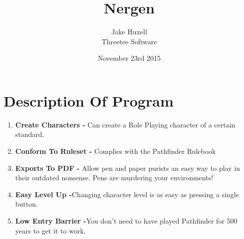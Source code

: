 \documentclass[12pt, a4paper]{article}
\title{Nergen}
\author{Jake Huxell\\Threetee Software}
\date{November 23rd 2015}
\begin{document}
\maketitle 
\tableofcontents
\section{Description Of Program}
\begin{enumerate}
\item{\textbf{Create Characters - }Can create a Role Playing character of a certain standard.}
\item{\textbf{Conform To Ruleset - }Complies with the Pathfinder Rulebook}
\item{\textbf{Exports To PDF - }Allow pen and paper purists an easy way to play in their outdated nonsense. Pens are murdering your environments!}
\item{\textbf{Easy Level Up -}Changing character level is as easy as pressing a single button.}
\item{\textbf{Low Entry Barrier -}You don't need to have played Pathfinder for 500 years to get it to work.}
\end{enumerate}
\end{document}
